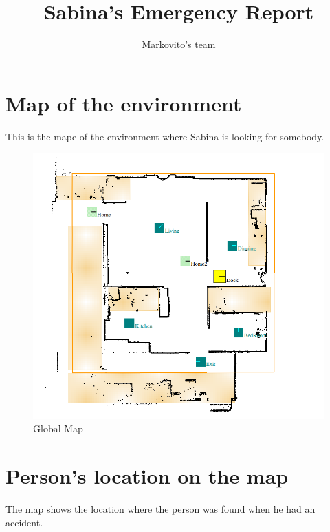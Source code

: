 \documentclass[11pt]{article}
\title{Sabina's Emergency Report }
\author{Markovito's team}
\begin{document}
\maketitle

\section{Map of the environment}
This is the mape of the environment where Sabina is looking for somebody.

\begin{figure}
	\begin{center}
		\includegraphics[width=1\textwidth]{map.png}
		\caption{Global Map}
	\end{center}
\end{figure}

\section{Person's location on the map}
The map shows the location where the person was found when he had an accident.
\end{document}

